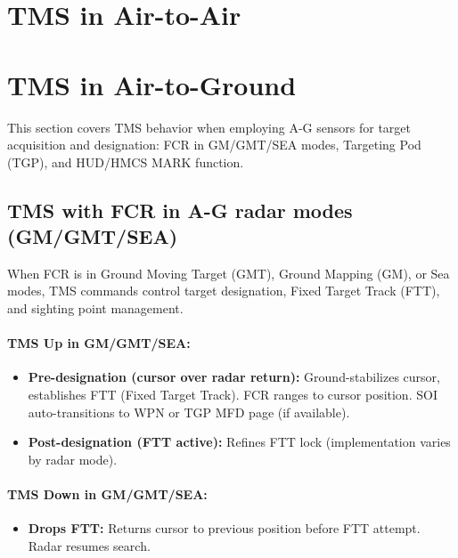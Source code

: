 \documentclass[11pt, a4paper, twoside]{report}
\begin{document}
\newpage
\section{TMS in Air-to-Air}
\label{sec:C4-S3}

\newpage
\section{TMS in Air-to-Ground}
\label{sec:C4-S4}

This section covers TMS behavior when employing A-G sensors for target acquisition and designation: FCR in GM/GMT/SEA modes, Targeting Pod (TGP), and HUD/HMCS MARK function.

\subsection{TMS with FCR in A-G radar modes (GM/GMT/SEA)}
\label{sec:C4-S4-S1}

When FCR is in Ground Moving Target (GMT), Ground Mapping (GM), or Sea modes, TMS commands control target designation, Fixed Target Track (FTT), and sighting point management.

\paragraph{TMS Up in GM/GMT/SEA:}
\begin{itemize}
    \item \textbf{Pre-designation (cursor over radar return):} Ground-stabilizes cursor, establishes FTT (Fixed Target Track). FCR ranges to cursor position. SOI auto-transitions to WPN or TGP MFD page (if available).
    \item \textbf{Post-designation (FTT active):} Refines FTT lock (implementation varies by radar mode).
\end{itemize}

\paragraph{TMS Down in GM/GMT/SEA:}
\begin{itemize}
    \item \textbf{Drops FTT:} Returns cursor to previous position before FTT attempt. Radar resumes search.
\end{itemize}
\end{document}
